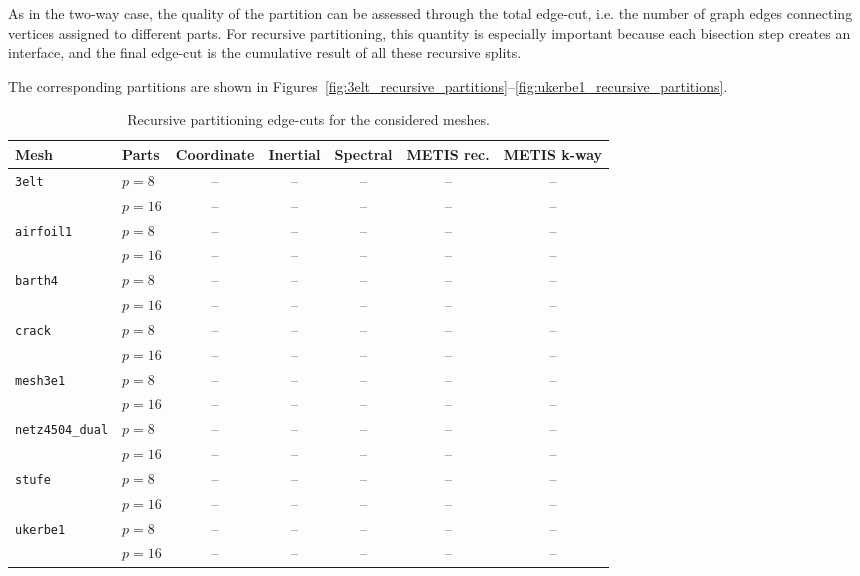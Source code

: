 \documentclass[unicode,10pt,a4paper,oneside,numbers=endperiod,openany]{scrartcl}
\begin{document}
As in the two-way case, the quality of the partition can be assessed through the total edge-cut,
i.e. the number of graph edges connecting vertices assigned to different parts. For recursive
partitioning, this quantity is especially important because each bisection step creates an
interface, and the final edge-cut is the cumulative result of all these recursive splits.

The corresponding partitions are shown in Figures~\ref{fig:3elt_recursive_partitions}--\ref{fig:ukerbe1_recursive_partitions}.

\begin{table}[h]
\centering
\begin{tabular}{llccccc}
\hline
\textbf{Mesh} & \textbf{Parts} & \textbf{Coordinate} & \textbf{Inertial} & \textbf{Spectral} & \textbf{METIS rec.} & \textbf{METIS k-way} \\
\hline
\multirow{2}{*}{\texttt{3elt}}
    & \(p=8\)  & -- & -- & -- & -- & -- \\
    & \(p=16\) & -- & -- & -- & -- & -- \\
\hline
\multirow{2}{*}{\texttt{airfoil1}}
    & \(p=8\)  & -- & -- & -- & -- & -- \\
    & \(p=16\) & -- & -- & -- & -- & -- \\
\hline
\multirow{2}{*}{\texttt{barth4}}
    & \(p=8\)  & -- & -- & -- & -- & -- \\
    & \(p=16\) & -- & -- & -- & -- & -- \\
\hline
\multirow{2}{*}{\texttt{crack}}
    & \(p=8\)  & -- & -- & -- & -- & -- \\
    & \(p=16\) & -- & -- & -- & -- & -- \\
\hline
\multirow{2}{*}{\texttt{mesh3e1}}
    & \(p=8\)  & -- & -- & -- & -- & -- \\
    & \(p=16\) & -- & -- & -- & -- & -- \\
\hline
\multirow{2}{*}{\texttt{netz4504\_dual}}
    & \(p=8\)  & -- & -- & -- & -- & -- \\
    & \(p=16\) & -- & -- & -- & -- & -- \\
\hline
\multirow{2}{*}{\texttt{stufe}}
    & \(p=8\)  & -- & -- & -- & -- & -- \\
    & \(p=16\) & -- & -- & -- & -- & -- \\
\hline
\multirow{2}{*}{\texttt{ukerbe1}}
    & \(p=8\)  & -- & -- & -- & -- & -- \\
    & \(p=16\) & -- & -- & -- & -- & -- \\
\hline
\end{tabular}
\caption{Recursive partitioning edge-cuts for the considered meshes.}
\label{tab:recursive_edgecuts_first}
\end{table}
\end{document}
